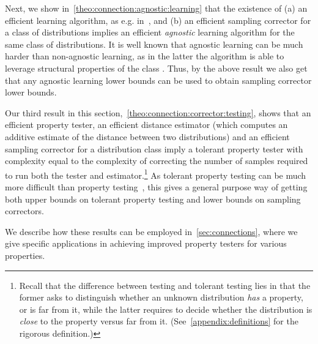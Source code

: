 Next, we show in~\autoref{theo:connection:agnostic:learning} that the existence of \textsf{(a)} an efficient
learning algorithm, as e.g. in~\cite{ILR:12,CDSS:13,DDS:PBD:12,DDOST:13}, and \textsf{(b)} an efficient sampling
corrector for a class of distributions implies an efficient 
 \emph{agnostic} learning
algorithm for the same class of distributions.
It is well known that agnostic learning 
can be much harder than non-agnostic learning, 
as in the latter the algorithm is able to leverage structural properties of the class \class. Thus, by the above result we also get that any agnostic learning lower bounds can be used to obtain sampling corrector lower bounds.


Our third result in this section,~\autoref{theo:connection:corrector:testing}, shows that an efficient property tester, 
an efficient distance estimator (which computes an additive estimate of the distance between two distributions) and an efficient sampling corrector for
a distribution class imply a tolerant property tester with complexity
equal to the complexity of correcting the number of samples required to run both the tester and estimator.\footnote{Recall that the difference between  testing and tolerant testing lies in that the former asks to distinguish whether an unknown distribution \emph{has} a property, or is far from it, while the latter requires to decide whether the distribution is \emph{close} to the property versus far from it. (See~\autoref{appendix:definitions} for the rigorous definition.)}
As tolerant property testing can be much more difficult than
property testing~\cite{GRexp:00,BFRSW:10,Paninski:08,ValiantValiant:11}, this gives a general purpose way of getting
both upper bounds on tolerant property testing and lower bounds
on sampling correctors.\medskip

\noindent We describe how these results can be employed in~\autoref{sec:connections}, where we give 
specific applications in achieving improved property testers for various properties.


